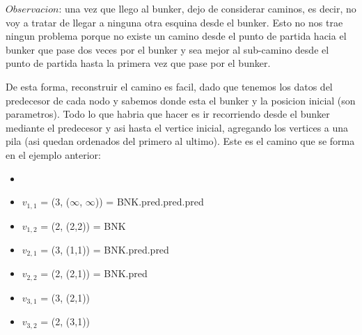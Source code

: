 
\medskip

$Observacion$: una vez que llego al bunker, dejo de considerar caminos, es decir, no voy a tratar de llegar a ninguna otra esquina desde el bunker. Esto no nos trae ningun problema porque no existe un camino desde el punto de partida hacia el bunker que pase dos veces por el bunker y sea mejor al sub-camino desde el punto de partida hasta la primera vez que pase por el bunker.

\medskip

De esta forma, reconstruir el camino es facil, dado que tenemos los datos del predecesor de cada nodo y sabemos donde esta el bunker y la posicion inicial (son parametros). Todo lo que habria que hacer es ir recorriendo desde el bunker mediante el predecesor y asi hasta el vertice inicial, agregando los vertices a una pila (asi quedan ordenados del primero al ultimo). Este es el camino que se forma en el ejemplo anterior:

\medskip

\begin{multicols}{2}
\columnbreak
\columnbreak
  \begin{itemize}[noitemsep]
      \item[]
      \item $v_{1,1}$ = (3, ($\infty$, $\infty$)) = BNK.pred.pred.pred
      \item $v_{1,2}$ = (2, (2,2)) = BNK
      \item $v_{2,1}$ = (3, (1,1)) = BNK.pred.pred
      \item $v_{2,2}$ = (2, (2,1)) = BNK.pred
      \item $v_{3,1}$ = (3, (2,1))
      \item $v_{3,2}$ = (2, (3,1))
    \end{itemize}
\end{multicols}

\medskip

